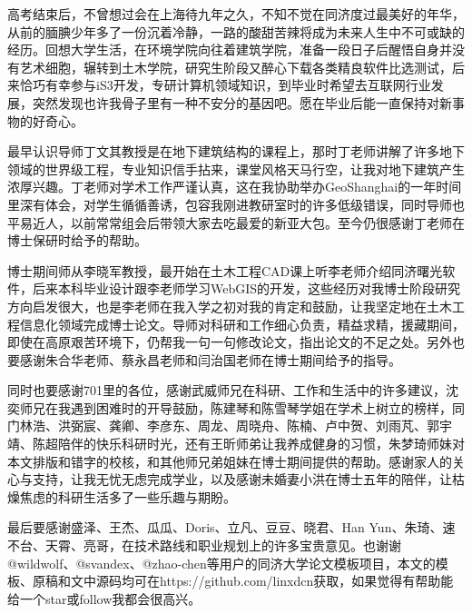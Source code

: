 \begin{ack}\fs
高考结束后，不曾想过会在上海待九年之久，不知不觉在同济度过最美好的年华，从前的腼腆少年多了一份沉着冷静，一路的酸甜苦辣将成为未来人生中不可或缺的经历。回想大学生活，在环境学院向往着建筑学院，准备一段日子后醒悟自身并没有艺术细胞，辗转到土木学院，研究生阶段又醉心下载各类精良软件比选测试，后来恰巧有幸参与iS3开发，专研计算机领域知识，到毕业时希望去互联网行业发展，突然发现也许我骨子里有一种不安分的基因吧。愿在毕业后能一直保持对新事物的好奇心。

最早认识导师丁文其教授是在地下建筑结构的课程上，那时丁老师讲解了许多地下领域的世界级工程，专业知识信手拈来，课堂风格天马行空，让我对地下建筑产生浓厚兴趣。丁老师对学术工作严谨认真，这在我协助举办GeoShanghai的一年时间里深有体会，对学生循循善诱，包容我刚进教研室时的许多低级错误，同时导师也平易近人，以前常常组会后带领大家去吃最爱的新亚大包。至今仍很感谢丁老师在博士保研时给予的帮助。

博士期间师从李晓军教授，最开始在土木工程CAD课上听李老师介绍同济曙光软件，后来本科毕业设计跟李老师学习WebGIS的开发，这些经历对我博士阶段研究方向启发很大，也是李老师在我入学之初对我的肯定和鼓励，让我坚定地在土木工程信息化领域完成博士论文。导师对科研和工作细心负责，精益求精，援藏期间，即使在高原艰苦环境下，仍帮我一句一句修改论文，指出论文的不足之处。另外也要感谢朱合华老师、蔡永昌老师和闫治国老师在博士期间给予的指导。

同时也要感谢701里的各位，感谢武威师兄在科研、工作和生活中的许多建议，沈奕师兄在我遇到困难时的开导鼓励，陈建琴和陈雪琴学姐在学术上树立的榜样，同门林浩、洪弼宸、龚卿、李彦东、周龙、周晓舟、陈楠、卢中贺、刘雨芃、郭宇靖、陈超陪伴的快乐科研时光，还有王昕师弟让我养成健身的习惯，朱梦琦师妹对本文排版和错字的校核，和其他师兄弟姐妹在博士期间提供的帮助。感谢家人的关心与支持，让我无忧无虑完成学业，以及感谢未婚妻小洪在博士五年的陪伴，让枯燥焦虑的科研生活多了一些乐趣与期盼。

最后要感谢盛泽、王杰、瓜瓜、Doris、立凡、豆豆、晓君、Han Yun、朱琦、速不台、天霄、亮哥，在技术路线和职业规划上的许多宝贵意见。也谢谢@wildwolf、@svandex、@zhao-chen等用户的同济大学论文模板项目，本文的模板、原稿和文中源码均可在https://github.com/linxdcn获取，如果觉得有帮助能给一个star或follow我都会很高兴。


\end{ack}